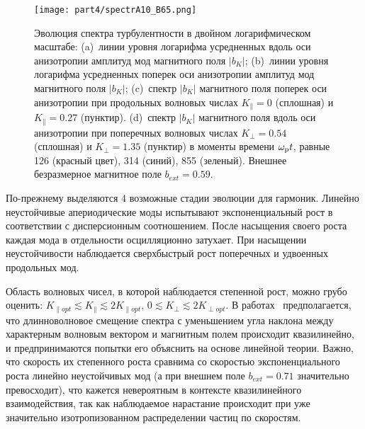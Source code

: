 \begin{figure}[h!]

\texttt{[image: part4/spectrA10\_B65.png]}
\caption{Эволюция спектра турбулентности в двойном логарифмическом масштабе: (a)~линии уровня логарифма усредненных вдоль оси анизотропии амплитуд мод магнитного поля $|b_K|$; 
(b)~линии уровня логарифма усредненных поперек оси анизотропии амплитуд мод магнитного поля $|b_K|$; 
(c)~спектр $|b_K|$ магнитного поля поперек оси анизотропии при продольных волновых числах $K_\|=0$ (сплошная) и $K_\|=0.27$ (пунктир). 
(d)~спектр $|b_K|$ магнитного поля вдоль оси анизотропии при поперечных волновых числах $K_\perp=0.54$ (сплошная) и $K_\perp=1.35$ (пунктир) в моменты времени $\omega_\mathrm{p} t$, равные 126 (красный цвет), 314 (синий), 855 (зеленый). Внешнее безразмерное магнитное поле $b_{ext}=0.59$.
}
\label{ris:spectrA10_B65}
\end{figure}

По-прежнему выделяются 4 возможные стадии эволюции для гармоник. Линейно неустойчивые апериодические моды испытывают экспоненциальный рост в соответствии с дисперсионным соотношением. После насыщения своего роста каждая мода в отдельности осцилляционно затухает. При насыщении неустойчивости наблюдается сверхбыстрый рост поперечных и удвоенных продольных мод. 


Область волновых чисел, в которой наблюдается степенной рост, можно грубо оценить: $K_{\|opt}\lesssim  K_\|\lesssim 2K_{\|opt}$, $0\lesssim K_\perp\lesssim 2K_{\perp opt}$. В работах~\cite{Camporeale2008,Hellinger2014} предполагается, что длинноволновое смещение спектра с уменьшением угла наклона между характерным волновым вектором и магнитным полем происходит квазилинейно, и предпринимаются попытки его объяснить на основе линейной теории. Важно, что скорость их степенного роста сравнима со скоростью экспоненциального роста линейно неустойчивых мод (а при внешнем поле $b_{ext}=0.71$ значительно превосходит), что кажется невероятным в контексте квазилинейного взаимодействия, так как наблюдаемое нарастание происходит при уже значительно изотропизованном распределении частиц по скоростям. 


